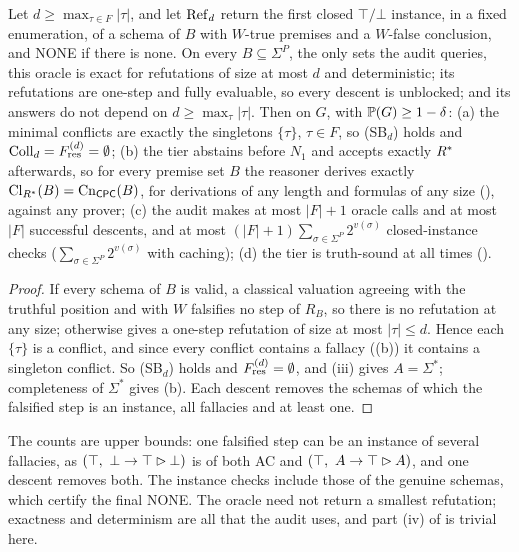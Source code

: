 \begin{corollary}\label{cor:twotier:cpc}
Let $d\ge\max_{\tau\in F}|\tau|$, and let $\mathrm{Ref}_d$ return the first closed $\top/\bot$ instance, in a fixed enumeration, of a schema of $B$ with $W$-true premises and a $W$-false conclusion, and NONE if there is none. On every $B\subseteq\Sigma^P$, the only sets the audit queries, this oracle is exact for refutations of size at most $d$ and deterministic; its refutations are one-step and fully evaluable, so every descent is unblocked; and its answers do not depend on $d\ge\max_\tau|\tau|$. Then on $G$, with $\mathbb{P}(G)\ge1-\delta$:
\textup{(a)} the minimal conflicts are exactly the singletons $\{\tau\}$, $\tau\in F$, so (SB$_d$) holds and $\mathrm{Coll}_d=F^{(d)}_{\mathrm{res}}=\emptyset$;
\textup{(b)} the tier abstains before $N_1$ and accepts exactly $R^{*}$ afterwards, so for every premise set $B$ the reasoner derives exactly $\mathrm{Cl}_{R^{*}}(B)=\mathrm{Cn}_{\mathsf{CPC}}(B)$, for derivations of any length and formulas of any size (), against any prover;
\textup{(c)} the audit makes at most $|F|+1$ oracle calls and at most $|F|$ successful descents, and at most $(|F|+1)\sum_{\sigma\in\Sigma^P}2^{v(\sigma)}$ closed-instance checks ($\sum_{\sigma\in\Sigma^P}2^{v(\sigma)}$ with caching);
\textup{(d)} the tier is truth-sound at all times ().
\end{corollary}

\begin{proof}
If every schema of $B$ is valid, a classical valuation agreeing with the truthful position and with $W$ falsifies no step of $R_B$, so there is no refutation at any size; otherwise  gives a one-step refutation of size at most $|\tau|\le d$. Hence each $\{\tau\}$ is a conflict, and since every conflict contains a fallacy ((b)) it contains a singleton conflict. So (SB$_d$) holds and $F^{(d)}_{\mathrm{res}}=\emptyset$, and (iii) gives $A=\Sigma^*$; completeness of $\Sigma^*$ gives (b). Each descent removes the schemas of which the falsified step is an instance, all fallacies and at least one.
\end{proof}

The counts are upper bounds: one falsified step can be an instance of several fallacies, as $(\top,\ \bot\to\top\step\bot)$ is of both AC and $(\top,\ A\to\top\rhd A)$, and one descent removes both. The instance checks include those of the genuine schemas, which certify the final NONE. The oracle need not return a smallest refutation; exactness and determinism are all that the audit uses, and part (iv) of  is trivial here.

